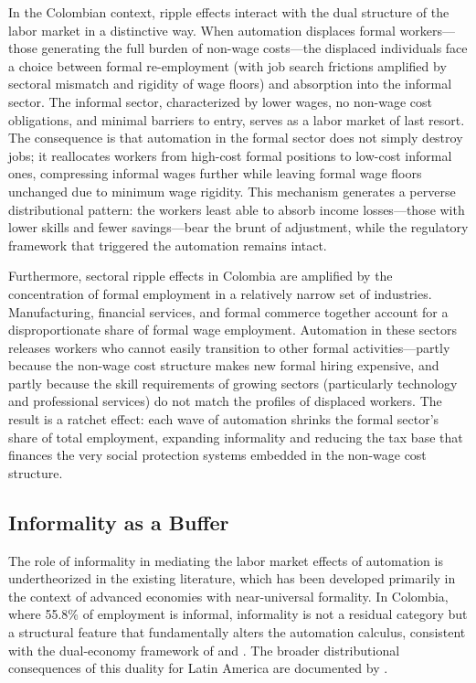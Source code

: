 \documentclass{article}
\begin{document}
In the Colombian context, ripple effects interact with the dual structure of the labor market in a distinctive way. When automation displaces formal workers---those generating the full burden of non-wage costs---the displaced individuals face a choice between formal re-employment (with job search frictions amplified by sectoral mismatch and rigidity of wage floors) and absorption into the informal sector. The informal sector, characterized by lower wages, no non-wage cost obligations, and minimal barriers to entry, serves as a labor market of last resort. The consequence is that automation in the formal sector does not simply destroy jobs; it reallocates workers from high-cost formal positions to low-cost informal ones, compressing informal wages further while leaving formal wage floors unchanged due to minimum wage rigidity. This mechanism generates a perverse distributional pattern: the workers least able to absorb income losses---those with lower skills and fewer savings---bear the brunt of adjustment, while the regulatory framework that triggered the automation remains intact.

Furthermore, sectoral ripple effects in Colombia are amplified by the concentration of formal employment in a relatively narrow set of industries. Manufacturing, financial services, and formal commerce together account for a disproportionate share of formal wage employment. Automation in these sectors releases workers who cannot easily transition to other formal activities---partly because the non-wage cost structure makes new formal hiring expensive, and partly because the skill requirements of growing sectors (particularly technology and professional services) do not match the profiles of displaced workers. The result is a ratchet effect: each wave of automation shrinks the formal sector's share of total employment, expanding informality and reducing the tax base that finances the very social protection systems embedded in the non-wage cost structure.

\subsection{Informality as a Buffer}
\label{subsec:informality_theory}

The role of informality in mediating the labor market effects of automation is undertheorized in the existing literature, which has been developed primarily in the context of advanced economies with near-universal formality. In Colombia, where 55.8\% of employment is informal, informality is not a residual category but a structural feature that fundamentally alters the automation calculus, consistent with the dual-economy framework of \cite{laporta2014} and \cite{ulyssea2018}. The broader distributional consequences of this duality for Latin America are documented by \cite{busso2020}.
\end{document}
